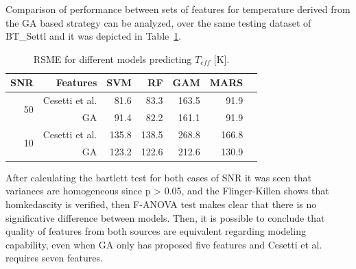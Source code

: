 {
Comparison of performance between sets of features for temperature 
derived from the GA based strategy can be analyzed, 
over the same testing dataset of BT\_Settl and it was depicted 
in Table~\ref{tab:model_TSD}.

\begin{table}
\begin{center}
\begin{tabular}{rrrrrrr}
  \hline
  SNR & Features & SVM & RF & GAM  & MARS  \\
  \hline
  \multirow{2}{*}{50}  &  Cesetti et al. & 81.6 &  83.3 & 163.5 & 91.9 \\
      &  GA             & 91.4 & 82.2 & 161.1  & 91.9  \\
  \multirow{2}{*}{10}  &  Cesetti et al. & 135.8 & 138.5 & 268.8 & 166.8  \\
      &  GA             & 123.2 & 122.6 & 212.6 & 130.9  \\
   \hline
\end{tabular}
\caption { RSME for different models predicting $T_{eff}$ [K].} 
\label{tab:model_TSD} 
\end{center}
\end{table}

After calculating the bartlett test for both cases of SNR it was 
seen that variances are homogeneous since p > 0.05, and 
the Flinger-Killen shows that homkedascity is verified, 
then F-ANOVA test makes clear that there is no significative 
difference between models. Then, it is possible to conclude
that quality of features from both sources are equivalent
regarding modeling capability, even when GA only has proposed five
features and Cesetti et al. requires seven features.

}

